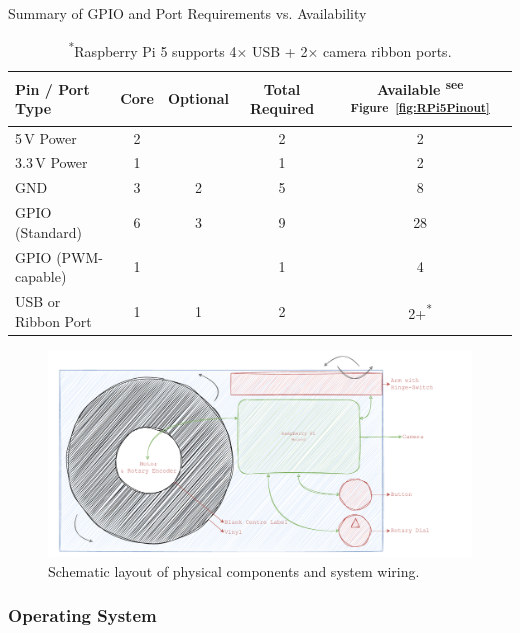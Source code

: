                 \begin{table}[htbp]
                    \centering
                    \caption{Summary of GPIO and Port Requirements vs. Availability}
                    \label{tab:pinSummary}
                    \begin{tabular}{|l|c|c|c|c|}
                        \hline
                        \textbf{Pin / Port Type} & \textbf{Core}& \textbf{Optional}& \textbf{Total Required} & \textbf{Available} \textsuperscript{see Figure~\ref{fig:RPi5Pinout}
    }}\\ \hline
                        5\,V Power & 2 & & 2 & 2 \\ \hline
                        3.3\,V Power & 1 & & 1& 2 \\ \hline
                        GND & 3 & 2 & 5 & 8 \\ \hline
                        GPIO (Standard) & 6 & 3 & 9 & 28 \\ \hline
                        GPIO (PWM-capable) & 1 & & 1 & 4 \\ \hline
                        USB or Ribbon Port & 1 & 1 & 2 & 2+\textsuperscript{*}\\ \hline
                    \end{tabular}
                    \caption*{\textsuperscript{*}Raspberry Pi 5 supports 4× USB + 2× camera ribbon ports.}
                \end{table}
    
                \begin{figure}[h]
                    \centering
                    \includegraphics[width=0.95\linewidth]{images/SketchPhys.pdf}
                    \caption{Schematic layout of physical components and system wiring.}
                    \label{fig:sketchPhys}
                \end{figure}
    
            \subsubsection{Operating System}
    
